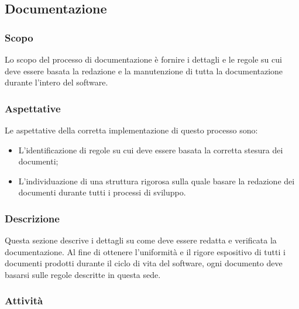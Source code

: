 \documentclass[../norme-di-progetto.tex]{subfiles}
\begin{document}
\subsection{Documentazione}
\subsubsection{Scopo}
Lo scopo del processo di documentazione è fornire i dettagli e le regole su cui deve essere basata la redazione e la manutenzione di tutta la documentazione durante l'intero  del software.

\subsubsection{Aspettative}
Le aspettative della corretta implementazione di questo processo sono:
\begin{itemize}
  \item L'identificazione di regole su cui deve essere basata la corretta stesura dei documenti;
  \item L'individuazione di una struttura rigorosa sulla quale basare la redazione dei documenti durante tutti i processi di sviluppo.
\end{itemize}

\subsubsection{Descrizione}
Questa sezione descrive i dettagli su come deve essere redatta e verificata la documentazione. Al fine di ottenere l'uniformità e il rigore espositivo di tutti i documenti prodotti durante il ciclo di vita del software, ogni documento deve basarsi sulle regole descritte in questa sede.

\subsubsection{Attività}
\end{document}
